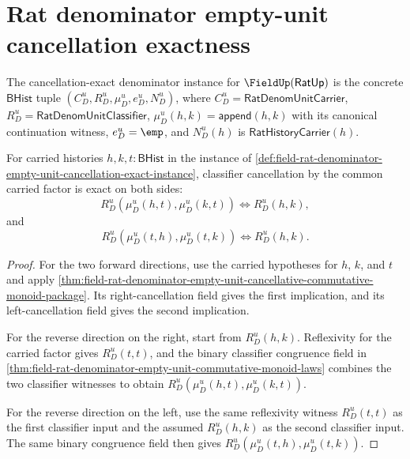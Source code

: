 \section{Rat denominator empty-unit cancellation exactness}
\label{sec:field-rat-denominator-empty-unit-cancellation-exactness}

\begin{definition}
\label{def:field-rat-denominator-empty-unit-cancellation-exact-instance}
The cancellation-exact denominator instance for $\FieldUp(\mathsf{RatUp})$ is
the concrete $\mathsf{BHist}$ tuple
$(C_D^u,R_D^u,\mu_D^u,e_D^u,N_D^u)$, where
$C_D^u=\mathsf{RatDenomUnitCarrier}$,
$R_D^u=\mathsf{RatDenomUnitClassifier}$,
$\mu_D^u(h,k)=\mathsf{append}(h,k)$ with its canonical continuation witness,
$e_D^u=\emp$, and $N_D^u(h)$ is $\mathsf{RatHistoryCarrier}(h)$.
\end{definition}

\begin{theorem}
\label{thm:field-rat-denominator-empty-unit-cancellation-exactness}
\label{thm:field-rat-denominator-empty-unit-right-multiplication-classifier-exactness}
For carried histories $h,k,t:\mathsf{BHist}$ in the instance of
\autoref{def:field-rat-denominator-empty-unit-cancellation-exact-instance},
classifier cancellation by the common carried factor is exact on both sides:
$$
R_D^u(\mu_D^u(h,t),\mu_D^u(k,t)) \Longleftrightarrow R_D^u(h,k),
$$
and
$$
R_D^u(\mu_D^u(t,h),\mu_D^u(t,k)) \Longleftrightarrow R_D^u(h,k).
$$
\end{theorem}
\begin{proof}
For the two forward directions, use the carried hypotheses for $h$, $k$, and
$t$ and apply
\autoref{thm:field-rat-denominator-empty-unit-cancellative-commutative-monoid-package}.
Its right-cancellation field gives the first implication, and its
left-cancellation field gives the second implication.

For the reverse direction on the right, start from $R_D^u(h,k)$. Reflexivity
for the carried factor gives $R_D^u(t,t)$, and the binary classifier congruence
field in
\autoref{thm:field-rat-denominator-empty-unit-commutative-monoid-laws} combines
the two classifier witnesses to obtain
$R_D^u(\mu_D^u(h,t),\mu_D^u(k,t))$.

For the reverse direction on the left, use the same reflexivity witness
$R_D^u(t,t)$ as the first classifier input and the assumed $R_D^u(h,k)$ as the
second classifier input. The same binary congruence field then gives
$R_D^u(\mu_D^u(t,h),\mu_D^u(t,k))$.
\end{proof}

